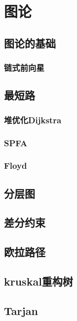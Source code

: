 \documentclass{probook}
\begin{document}
\chapter{图论}
\section{图论的基础}
\subsection{链式前向星}

\section{最短路}
\subsection{堆优化Dijkstra}

\subsection{SPFA}

\subsection{Floyd}

\section{分层图}

\section{差分约束}

\section{欧拉路径}

\section{kruskal重构树}

\section{Tarjan}
\end{document}
